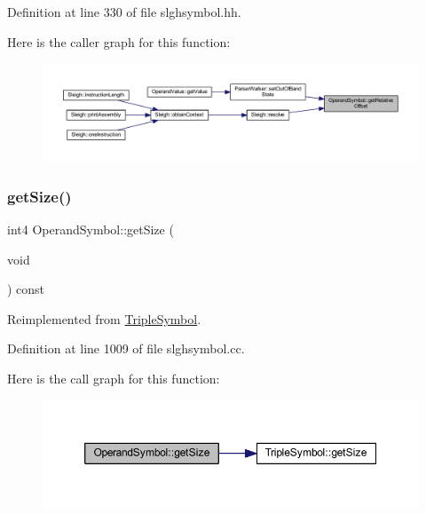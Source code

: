 Definition at line 330 of file slghsymbol.\+hh.

Here is the caller graph for this function\+:
\nopagebreak
\begin{figure}[H]
\begin{center}
\leavevmode
\includegraphics[width=350pt]{class_operand_symbol_a172e311e45795d49ee679fac4a35faad_icgraph}
\end{center}
\end{figure}
\mbox{\label{class_operand_symbol_a9082a923e1e8f929c9fc0409f14fac74}} 
\subsubsection{\texorpdfstring{getSize()}{getSize()}}
{\footnotesize\ttfamily int4 Operand\+Symbol\+::get\+Size (\begin{DoxyParamCaption}\item[{void}]{ }\end{DoxyParamCaption}) const\hspace{0.3cm}{\ttfamily [virtual]}}



Reimplemented from \mbox{\hyperlink{class_triple_symbol_a7351de4a1db140381d0b7913a8c613fd}{Triple\+Symbol}}.



Definition at line 1009 of file slghsymbol.\+cc.

Here is the call graph for this function\+:
\nopagebreak
\begin{figure}[H]
\begin{center}
\leavevmode
\includegraphics[width=350pt]{class_operand_symbol_a9082a923e1e8f929c9fc0409f14fac74_cgraph}
\end{center}
\end{figure}
\mbox{\label{class_operand_symbol_aef01562ac38960c6b9fe99ecd574b6f6}} 

